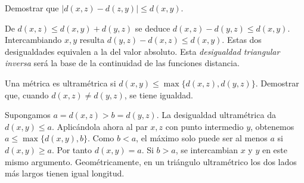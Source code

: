 \begin{ejercicio}\label{ej:lectura-1-6}
Demostrar que $|d(x,z)-d(z,y)|\le d(x,y)$.
\end{ejercicio}
\begin{solucion}
De $d(x,z)\le d(x,y)+d(y,z)$ se deduce $d(x,z)-d(y,z)\le d(x,y)$. Intercambiando $x,y$ resulta $d(y,z)-d(x,z)\le d(x,y)$. Estas dos desigualdades equivalen a la del valor absoluto. Esta \emph{desigualdad triangular inversa} será la base de la continuidad de las funciones distancia.
\end{solucion}

\begin{ejercicio}\label{ej:lectura-1-7}
Una métrica es ultramétrica si $d(x,y)\le\max\{d(x,z),d(y,z)\}$. Demostrar que, cuando $d(x,z)\ne d(y,z)$, se tiene igualdad.
\end{ejercicio}
\begin{solucion}
Supongamos $a=d(x,z)>b=d(y,z)$. La desigualdad ultramétrica da $d(x,y)\le a$. Aplicándola ahora al par $x,z$ con punto intermedio $y$, obtenemos $a\le\max\{d(x,y),b\}$. Como $b<a$, el máximo solo puede ser al menos $a$ si $d(x,y)\ge a$. Por tanto $d(x,y)=a$. Si $b>a$, se intercambian $x$ y $y$ en este mismo argumento. Geométricamente, en un triángulo ultramétrico los dos lados más largos tienen igual longitud.
\end{solucion}

